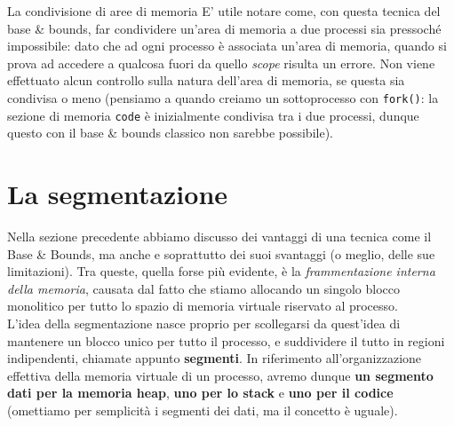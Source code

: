 \documentclass[12pt]{report}
\begin{document}
	\begin{osservazione}{La condivisione di aree di memoria}{}
		E' utile notare come, con questa tecnica del base \& bounds, far condividere un'area di memoria a due processi sia pressoché impossibile: dato che ad ogni processo è associata un'area di memoria, quando si prova ad accedere a qualcosa fuori da quello \textit{scope} risulta un errore. Non viene effettuato alcun controllo sulla natura dell'area di memoria, se questa sia condivisa o meno (pensiamo a quando creiamo un sottoprocesso con \texttt{fork()}: la sezione di memoria \texttt{code} è inizialmente condivisa tra i due processi, dunque questo con il base \& bounds classico non sarebbe possibile).
	\end{osservazione}
	
	\section{La segmentazione}
	Nella sezione precedente abbiamo discusso dei vantaggi di una tecnica come il Base \& Bounds, ma anche e soprattutto dei suoi svantaggi (o meglio, delle sue limitazioni). Tra queste, quella forse più evidente, è la \textit{frammentazione interna della memoria}, causata dal fatto che stiamo allocando un singolo blocco monolitico per tutto lo spazio di memoria virtuale riservato al processo.\\
	L'idea della segmentazione nasce proprio per scollegarsi da quest'idea di mantenere un blocco unico per tutto il processo, e suddividere il tutto in regioni indipendenti, chiamate appunto \textbf{segmenti}. In riferimento all'organizzazione effettiva della memoria virtuale di un processo, avremo dunque \textbf{un segmento dati per la memoria heap}, \textbf{uno per lo stack} e \textbf{uno per il codice} (omettiamo per semplicità i segmenti dei dati, ma il concetto è uguale).\\
	
\end{document}
